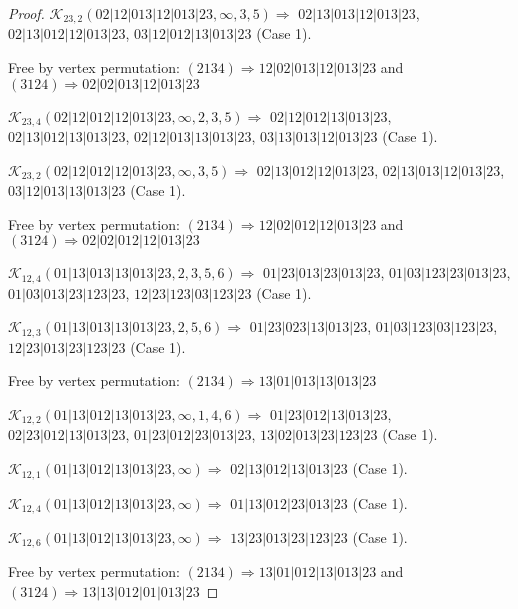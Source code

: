 \documentclass[12pt]{article}
\theoremstyle{plain}
\theoremstyle{definition}
\theoremstyle{remark}
\newcommand{\fancy}[1]{\mathcal{#1}}
\def\K{\fancy{K}}
\begin{document}
\begin{proof}
	$\K_{23,2}(02|12|013|12|013|23,\infty,3, 5)\Rightarrow $ $02|13|013|12|013|23$, $02|13|012|12|013|23$, $03|12|012|13|013|23$ (Case 1).
	
	
	
	Free by vertex permutation: $(2 1 3 4)\Rightarrow 12|02|013|12|013|23$ and $(3 1 2 4)\Rightarrow 02|02|013|12|013|23$
	
	
	
	\bigskip
	
	$\K_{23,4}(02|12|012|12|013|23,\infty,2, 3, 5)\Rightarrow $ $02|12|012|13|013|23$, $02|13|012|13|013|23$, $02|12|013|13|013|23$, $03|13|013|12|013|23$ (Case 1).
	
	$\K_{23,2}(02|12|012|12|013|23,\infty,3, 5)\Rightarrow $ $02|13|012|12|013|23$, $02|13|013|12|013|23$, $03|12|013|13|013|23$ (Case 1).
	
	
	
	Free by vertex permutation: $(2 1 3 4)\Rightarrow 12|02|012|12|013|23$ and $(3 1 2 4)\Rightarrow 02|02|012|12|013|23$
	
	
	
	\bigskip
	
	$\K_{12,4}(01|13|013|13|013|23,2, 3, 5, 6)\Rightarrow $ $01|23|013|23|013|23$, $01|03|123|23|013|23$, $01|03|013|23|123|23$, $12|23|123|03|123|23$ (Case 1).
	
	$\K_{12,3}(01|13|013|13|013|23,2, 5, 6)\Rightarrow $ $01|23|023|13|013|23$, $01|03|123|03|123|23$, $12|23|013|23|123|23$ (Case 1).
	
	
	
	Free by vertex permutation: $(2 1 3 4)\Rightarrow 13|01|013|13|013|23$
	
	
	
	\bigskip
	
	$\K_{12,2}(01|13|012|13|013|23,\infty,1, 4, 6)\Rightarrow $ $01|23|012|13|013|23$, $02|23|012|13|013|23$, $01|23|012|23|013|23$, $13|02|013|23|123|23$ (Case 1).
	
	$\K_{12,1}(01|13|012|13|013|23,\infty)\Rightarrow $ $02|13|012|13|013|23$ (Case 1).
	
	$\K_{12,4}(01|13|012|13|013|23,\infty)\Rightarrow $ $01|13|012|23|013|23$ (Case 1).
	
	$\K_{12,6}(01|13|012|13|013|23,\infty)\Rightarrow $ $13|23|013|23|123|23$ (Case 1).
	
	
	
	Free by vertex permutation: $(2 1 3 4)\Rightarrow 13|01|012|13|013|23$ and $(3 1 2 4)\Rightarrow 13|13|012|01|013|23$
	
	
	

\end{proof}
\end{document}
